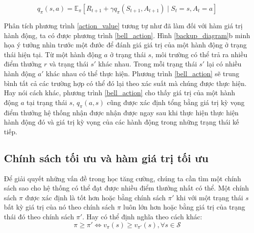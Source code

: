 \begin{equation}
\label{bell_action}
q_{\pi}(s,a) = \mathbb{E}_{\pi} \left[\mathit{R}_{t+1} + \gamma q_{\pi}(\mathit{S}_{t+1}, \mathit{A}_{t+1}) \mid \mathit{S}_t = s, \mathit{A}_t = a \right]
\end{equation}

Phân tích phương trình \ref{action_value} tương tự như đã làm đối với hàm giá trị hành động, ta có được phương trình \ref{bell_action}. Hình \ref{backup_diagram}b minh họa ý tưởng nhìn trước một đước để đánh giá giá trị của một hành động ở trạng thái hiện tại. Từ một hành động $a$ ở trạng thái $s$, môi trường có thể trả ra nhiều điểm thưởng $r$ và trạng thái $s'$ khác nhau. Trong mỗi trạng thái $s'$ lại có nhiều hành động $a'$ khác nhau có thể thực hiện. Phương trình \ref{bell_action} sẽ trung bình tất cả các trường hợp có thể đó lại theo xác suất mà chúng được thực hiện. Hay nói cách khác, phương trình \ref{bell_action} cho thấy giá trị của một hành động $a$ tại trạng thái $s$, $q_{\pi}(a,s)$ cũng được xác định tổng bằng giá trị kỳ vọng điểm thưởng hệ thống nhận được nhận được ngay sau khi thực hiện thực hiện hành động đó và giá trị kỳ vọng của các hành động trong những trạng thái kế tiếp.

\subsection{Chính sách tối ưu và hàm giá trị tối ưu}
Để giải quyết những vấn đề trong học tăng cường, chúng ta cần tìm một chính sách sao cho hệ thống có thể đạt được nhiều điểm thưởng nhất có thể. Một chính sách $\pi$ được xác định là tốt hơn hoặc bằng chính sách $\pi'$ khi với một trạng thái $s$ bất kỳ giá trị của nó theo chính sách $\pi$ luôn lớn hơn hoặc bằng giá trị của trạng thái đó theo chính sách $\pi'$. Hay có thể định nghĩa theo cách khác:
\begin{equation}
\pi \geq \pi' \Longleftrightarrow v_{\pi}(s) \geq v_{\pi'}(s), \forall s \in \mathcal{S}
\end{equation}

